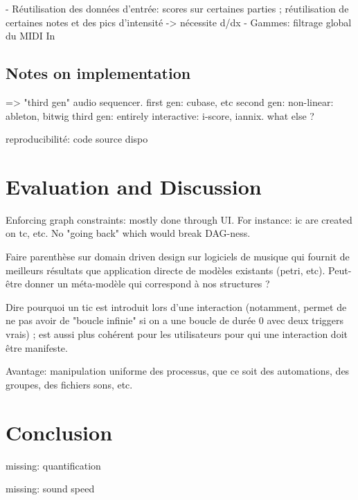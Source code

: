 \documentclass[applsci,article,submit,moreauthors,pdftex,10pt,a4paper]{mdpi}
\begin{document}
- Réutilisation des données d'entrée: scores sur certaines parties ; réutilisation de certaines notes et des pics d'intensité -> nécessite d/dx
- Gammes: filtrage global du MIDI In

\subsection{Notes on implementation}


=> "third gen" audio sequencer.
first gen: cubase, etc
second gen: non-linear: ableton, bitwig
third gen: entirely interactive: i-score, iannix. what else ? 

reproducibilité: code source dispo
\section{Evaluation and Discussion}
Enforcing graph constraints: mostly done through UI. For instance: ic are created on tc, etc. No "going back" which would break DAG-ness.

Faire parenthèse sur domain driven design sur logiciels de musique qui fournit de meilleurs résultats que application directe de modèles existants (petri, etc).
Peut-être donner un méta-modèle qui correspond à nos structures ?

Dire pourquoi un tic est introduit lors d'une interaction (notamment, permet de ne pas avoir de "boucle infinie" si on a une boucle de durée 0 avec deux triggers vrais) ; est aussi plus cohérent pour les utilisateurs pour qui une interaction doit être manifeste.

Avantage: manipulation uniforme des processus, que ce soit des automations, des groupes, des fichiers sons, etc.
\section{Conclusion}

missing: quantification

missing: sound speed



\end{document}
